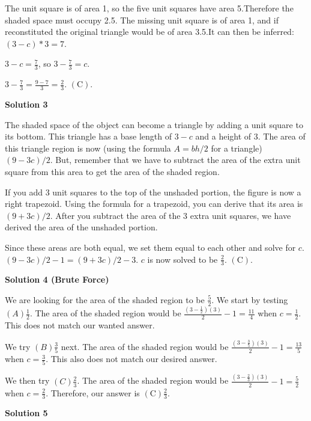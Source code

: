 \begin{enumerate}
The unit square is of area 1, so the five unit squares have area 5.Therefore the shaded space must occupy 2.5. The missing unit square is of area 1, and if reconstituted the original triangle would be of area 3.5.It can then be inferred:$(3-c) * 3 = 7$.

 $3-c=\frac{7}{3}$, so $3-\frac{7}{3}=c$.

 $3-\frac{7}{3} = \frac{9-7}{3} = \frac{2}{3}$. $\boxed{\mathrm{(C)}}$.

 



\textbf{Solution 3}

The shaded space of the object can become a triangle by adding a unit square to its bottom. This triangle has a base length of $3-c$ and a height of $3$. The area of this triangle region is now (using the formula $A=bh/2$ for a triangle)$(9-3c)/2$. But, remember that we have to subtract the area of the extra unit square from this area to get the area of the shaded region. 

 If you add 3 unit squares to the top of the unshaded portion, the figure is now a right trapezoid. Using the formula for a trapezoid, you can derive that its area is $(9+3c)/2$. After you subtract the area of the 3 extra unit squares, we have derived the area of the unshaded portion.

 Since these areas are both equal, we set them equal to each other and solve for $c$. $(9-3c)/2 -1 = (9+3c)/2 -3$. $c$ is now solved to be $\frac{2}{3}$. $\boxed{\mathrm{(C)}}$.

 



\textbf{Solution 4 (Brute Force)}

We are looking for the area of the shaded region to be $\frac 52$. We start by testing $(A) \frac 12$. The area of the shaded region would be $\frac{(3-\frac 12)(3) }{2}-1=\frac {11}{4}$ when $c=\frac 12$. This does not match our wanted answer.

 We try $(B) \frac 35$ next. The area of the shaded region would be $\frac{(3-\frac 35)(3) }{2}-1=\frac {13}{5}$ when $c=\frac 35$. This also does not match our desired answer.

 We then try $(C) \frac 23$. The area of the shaded region would be $\frac{(3-\frac 23)(3) }{2}-1=\frac {5}{2}$ when $c=\frac 23$. Therefore, our answer is $\boxed{\mathrm{(C) \frac 23}}$.

 



\textbf{Solution 5}


\end{enumerate}
